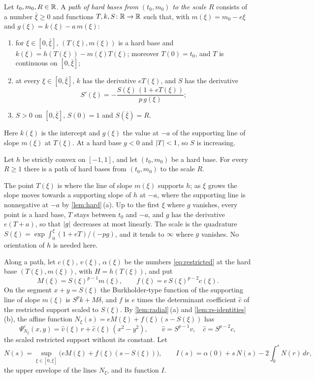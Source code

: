 \begin{definition}\label{def:path}
Let $t_0,m_0,R\in\mathbb{R}$. A \emph{path of hard bases from $(t_0,m_0)$ to the scale $R$} consists of
a number $\bar\xi\ge0$ and functions $T,k,S\colon\mathbb{R}\to\mathbb{R}$ such that, with $m(\xi)=m_0-e\xi$ and
$g(\xi)=k(\xi)-a\,m(\xi)$:
\begin{enumerate}[label=\textup{(\roman*)}]
\item for $\xi\in[0,\bar\xi]$, $(T(\xi),m(\xi))$ is a hard base and
  $k(\xi)=h(T(\xi))-m(\xi)T(\xi)$; moreover $T(0)=t_0$, and $T$ is continuous on
  $[0,\bar\xi]$;
\item at every $\xi\in[0,\bar\xi]$, $k$ has the derivative $eT(\xi)$, and $S$ has the derivative
  \[
    S'(\xi)=-\frac{S(\xi)\,(1+eT(\xi))}{p\,g(\xi)};
  \]
\item $S>0$ on $[0,\bar\xi]$, $S(0)=1$ and $S(\bar\xi)=R$.
\end{enumerate}
\end{definition}

Here $k(\xi)$ is the intercept and $g(\xi)$ the value at $-a$ of the supporting line of slope
$m(\xi)$ at $T(\xi)$. At a hard base $g<0$ and $\lvert T\rvert<1$, so $S$ is increasing.

\begin{proposition}\label{prop:path}
Let $h$ be strictly convex on $[-1,1]$, and let $(t_0,m_0)$ be a hard base. For every $R\ge1$
there is a path of hard bases from $(t_0,m_0)$ to the scale $R$.
\end{proposition}

The point $T(\xi)$ is where the line of slope $m(\xi)$ supports $h$; as $\xi$ grows the slope
moves towards a supporting slope of $h$ at $-a$, where the supporting line is nonnegative at
$-a$ by \cref{lem:hard}\,(a). Up to the first $\xi$ where $g$ vanishes, every point is a hard
base, $T$ stays between $t_0$ and $-a$, and $g$ has the derivative $e(T+a)$, so that
$\lvert g\rvert$ decreases at most linearly. The scale is the quadrature
$S(\xi)=\exp\int_0^\xi(1+eT)/(-pg)$, and it tends to $\infty$ where $g$ vanishes. No
orientation of $h$ is needed here.

Along a path, let $c(\xi)$, $v(\xi)$, $\alpha(\xi)$ be the numbers \eqref{eq:restricted} at the
hard base $(T(\xi),m(\xi))$, with $H=h(T(\xi))$, and put
\[
  M(\xi)=S(\xi)^{p-1}m(\xi),\qquad f(\xi)=e\,S(\xi)^{p-2}c(\xi).
\]
On the segment $x+y=S(\xi)$ the Burkholder-type function of the supporting line of slope $m(\xi)$
is $S^pk+M\delta$, and $f$ is $e$ times the determinant coefficient $\hat c$ of the restricted
support scaled to $S(\xi)$. By \cref{lem:radial}\,(a) and \cref{lem:rs-identities}\,(b), the
affine function $N_\xi(s)=eM(\xi)+f(\xi)(s-S(\xi))$ has
\[
  \Psi^e_{N_\xi}(x,y)=\hat v(\xi)\,r+\hat c(\xi)\,(x^2-y^2),\qquad
  \hat v=S^{p-1}v,\quad\hat c=S^{p-2}c,
\]
the scaled restricted support without its constant. Let
\[
  N(s)=\sup_{\xi\in[0,\bar\xi]}\bigl(eM(\xi)+f(\xi)(s-S(\xi))\bigr),\qquad
  I(s)=\alpha(0)+s\,N(s)-2\int_0^sN(r)\,dr ,
\]
the upper envelope of the lines $N_\xi$, and its function $I$.

